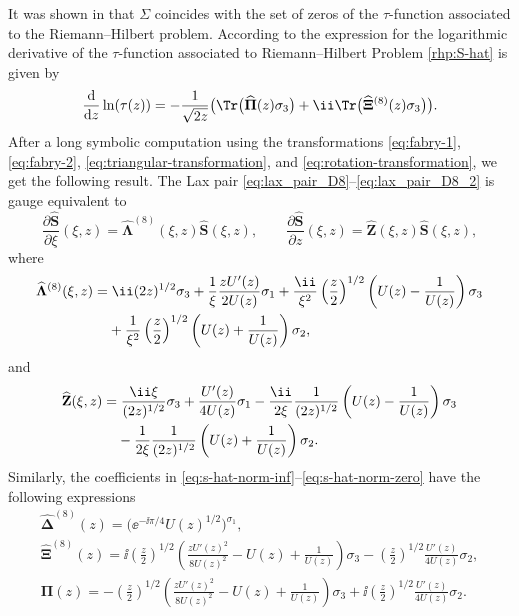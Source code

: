 It was shown in \cite{Palmer} that $\Sigma$ coincides with the set of zeros of the $\tau$-function associated to the Riemann--Hilbert problem. According to \cite{JMU} the expression for the logarithmic derivative of the $\tau$-function associated to Riemann--Hilbert Problem \ref{rhp:S-hat} is given by
\begin{gather} \label{eq:jmu-tau}
\dfrac{\mathrm{d}}{\mathrm{d}z}\ln(\tau(z))=-\frac{1}{\sqrt{2z}}\big(\Tr\big(\widehat{\mathbf{\Pi}}(z)\sigma_3\big)+\ii\Tr\big(\widehat{\mathbf{\Xi}}^{(8)}(z)\sigma_3\big)\big).
\end{gather}
 After a long symbolic computation using the transformations \eqref{eq:fabry-1}, \eqref{eq:fabry-2}, \eqref{eq:triangular-transformation}, and \eqref{eq:rotation-transformation}, we get the following result. The Lax pair \eqref{eq:lax_pair_D8}--\eqref{eq:lax_pair_D8_2} is gauge equivalent to
\[
\frac{\partial\widehat{\mathbf{S}}}{\partial\xi} (\xi, z) = {\widehat{\mathbf{\Lambda}}}^{(8)}(\xi, z) \widehat{\mathbf{S}}(\xi, z), \qquad
\frac{\partial\widehat{\mathbf{S}}}{\partial z} (\xi, z) = {\widehat{\mathbf{Z}}}(\xi, z) \widehat{\mathbf{S}}(\xi, z),
\]
where
\begin{align*}
&\widehat{\mathbf{\Lambda}}^{(8)}(\xi, z) = \ii(2z)^{1/2}\sigma_3 +\frac{1}{\xi}\frac{zU'(z)}{2U(z)}\sigma_1+\frac{\ii}{\xi^2}\left({\frac{z}{2}}\right)^{1/2}\left(U(z)-\frac{1}{U(z)}\right)\sigma_3\\
&\hphantom{\widehat{\mathbf{\Lambda}}^{(8)}(\xi, z) =}{}
+\frac{1}{\xi^2}\left({\frac{z}{2}}\right)^{1/2}\left(U(z)+\frac{1}{U(z)}\right)\sigma_2,
\end{align*}
and
\begin{align*}
&\widehat{\mathbf{Z}}(\xi, z) = \frac{\ii\xi}{(2z)^{1/2}}\sigma_3 +\frac{U'(z)}{4U(z)}\sigma_1-\frac{\ii}{2\xi}\frac{1}{(2z)^{1/2}}\left(U(z)-\frac{1}{U(z)}\right)\sigma_3\\
&\hphantom{\widehat{\mathbf{Z}}(\xi, z) =}{}
-\frac{1}{2\xi}\frac{1}{(2z)^{1/2}}\left(U(z)+\frac{1}{U(z)}\right)\sigma_2.
\end{align*}
Similarly, the coefficients in \eqref{eq:s-hat-norm-inf}--\eqref{eq:s-hat-norm-zero} have the following expressions
\begin{gather}
\widehat{\mathbf{\Delta}}^{(8)}(z)=\big(\ee^{-\ii\pi/4}U(z)^{1/2}\big)^{\sigma_1},\nonumber\\
\widehat{\mathbf{\Xi}}^{(8)}(z)=\ii\left(\frac{z}{2}\right)^{1/2}\left(\frac{zU'(z)^2}{8U(z)^2}-
 U(z)+\frac1{U(z)}\right)\sigma_3-\left(\frac{z}{2}\right)^{1/2}\frac{U'(z)}{4U(z)}\sigma_2,\nonumber\\
 \widehat{\mathbf{\Pi}}(z)=-\left(\frac{z}{2}\right)^{1/2}\left(\frac{zU'(z)^2}{8U(z)^2}-
 U(z)+\frac1{U(z)}\right)\sigma_3+\ii\left(\frac{z}{2}\right)^{1/2}\frac{U'(z)}{4U(z)}\sigma_2.\label{eq:s-hat-residues}
\end{gather}
